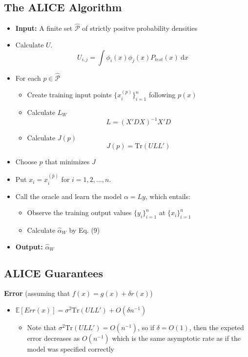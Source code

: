 \documentclass[10pt]{article}
\newcommand{\dd}{\text{d}}
\begin{document}
\subsection*{The ALICE Algorithm}
\begin{itemize}
	\item \textbf{Input:} A finite set $\hat{\mathcal{P}}$ of strictly positve probability densities
	\item Calculate $U$.  
	\[U_{i, j} = \int \phi_i(x) \phi_j(x) P_{test} (x) \:\dd x\]
    \item For each $p \in \hat{\mathcal{P}}$
    \begin{itemize}
	    \item Create training input points $\{x_i^{(p)}\}_{i = 1}^n$ following $p(x)$
	    \item Calculate $L_W$
	    \[L = (X' DX)^{-1} X' D\]
        \item Calculate $J(p)$
        \[J(p) = \text{Tr}(ULL')\]
    \end{itemize}
    \item Choose $\hat{p}$ that minimizes $J$
    \item Put $x_i = x_i^{(\hat{p})}$ for $i = 1, 2, \dots, n$.
    \item Call the oracle and learn the model $\alpha = Ly$, which entails:
    \begin{itemize}
        \item Observe the training output values $\{y_i\}_{i = 1}^n$ at $\{x_i\}_{i = 1}^n$
        \item Calculate $\hat{\alpha}_W$ by Eq. (9) 
    \end{itemize}
    \item \textbf{Output:} $\hat{\alpha}_W$
\end{itemize}

\subsection*{ALICE Guarantees}
\textbf{Error} (assuming that $f(x) = g(x) + \delta r(x)$)
\begin{itemize}
	\item $\mathbb{E}[Err(x)] = \sigma^2 \text{Tr}(ULL') + O(\delta n^{-1})$
    \begin{itemize}
	    \item Note that $\sigma^2 \text{Tr}(ULL') = O(n^{-1})$, so if $\delta = O(1)$, then the expeted error decreases as $O(n^{-1})$ which is the same asymptotic rate as if the model was specified correctly
    \end{itemize}
\end{itemize}
\end{document}

